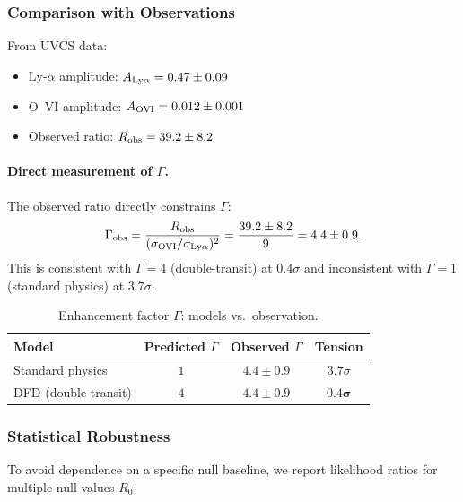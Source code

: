 \subsubsection{Comparison with Observations}

From UVCS data:
\begin{itemize}[nosep]
\item Ly-$\alpha$ amplitude: $A_{\rm Ly\alpha} = 0.47 \pm 0.09$
\item O~VI amplitude: $A_{\rm OVI} = 0.012 \pm 0.001$
\item Observed ratio: $R_{\rm obs} = 39.2 \pm 8.2$
\end{itemize}

\paragraph{Direct measurement of $\Gamma$.}
The observed ratio directly constrains $\Gamma$:
\begin{equation}
\Gamma_{\rm obs} = \frac{R_{\rm obs}}{(\sigma_{\rm OVI}/\sigma_{\rm Ly\alpha})^2} = \frac{39.2 \pm 8.2}{9} = 4.4 \pm 0.9.
\end{equation}
This is consistent with $\Gamma = 4$ (double-transit) at $0.4\sigma$ and inconsistent 
with $\Gamma = 1$ (standard physics) at $3.7\sigma$.

\begin{table}[h]
\centering
\caption{Enhancement factor $\Gamma$: models vs.\ observation.}\label{tab:Gamma-comparison}
\begin{ruledtabular}
\begin{tabular}{lccc}
\textbf{Model} & \textbf{Predicted $\Gamma$} & \textbf{Observed $\Gamma$} & \textbf{Tension} \\
\hline
Standard physics & $1$ & $4.4 \pm 0.9$ & $3.7\sigma$ \\
DFD (double-transit) & $4$ & $4.4 \pm 0.9$ & $\boldsymbol{0.4\sigma}$ \\
\end{tabular}
\end{ruledtabular}
\end{table}

\subsubsection{Statistical Robustness}

To avoid dependence on a specific null baseline, we report likelihood ratios for 
multiple null values $R_0$:

